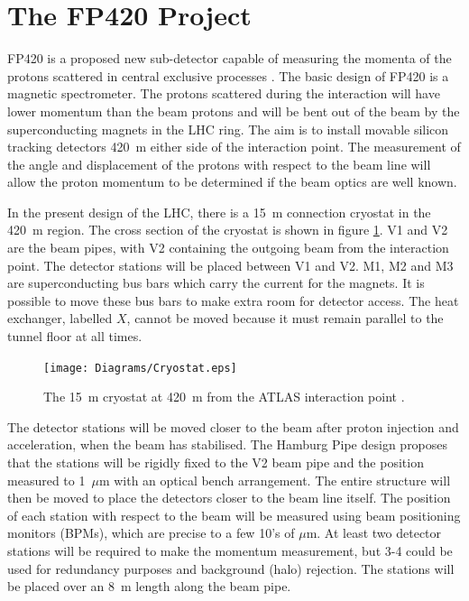 \section{The FP420 Project} \label{fp420}

FP420 is a proposed new sub-detector capable of measuring the momenta of the protons scattered in central exclusive processes \cite{Cox:2005tb}. The basic design of FP420 is a magnetic spectrometer. The protons scattered during the interaction will have lower momentum than the beam protons and will be bent out of the beam by the superconducting magnets in the LHC ring. The aim is to install movable silicon tracking detectors 420~m either side of the interaction point. The measurement of the angle and displacement of the protons with respect to the beam line will allow the proton momentum to be determined if the beam optics are well known.%

In the present design of the LHC, there is a 15~m connection cryostat in the 420~m region. The cross section of the cryostat is shown in figure \ref{cryostat420}. V1 and V2 are the beam pipes, with V2 containing the outgoing beam from the interaction point. The detector stations will be placed between V1 and V2. M1, M2 and M3 are superconducting bus bars which carry the current for the magnets. It is possible to move these bus bars to make extra room for detector access. 
The heat exchanger, labelled $X$, cannot be moved because it must remain parallel to the tunnel floor at all times. 

\begin{figure} [t]
\centering
    	\texttt{[image: Diagrams/Cryostat.eps]}
\caption[The 15~m cryostat at 420~m from the ATLAS interaction point]{The 15~m cryostat at 420~m from the ATLAS interaction point \cite{Cox:2005tb}.\label{cryostat420}}
\end{figure}

The detector stations will be moved closer to the beam after proton injection and acceleration, when the beam has stabilised. 
The Hamburg Pipe design proposes that the stations will be rigidly fixed to the V2 beam pipe and the position measured to 1~$\mu$m with an optical bench arrangement. The entire structure will then be moved to place the detectors closer to the beam line itself. 
%
%
The position of each station with respect to the beam will be measured using beam positioning monitors (BPMs), which are precise to a few 10's of $\mu$m. %
At least two detector stations will be required to make the momentum measurement, but 3-4 could be used for redundancy purposes and background (halo) rejection. The stations will be placed over an 8~m length along the beam pipe.

